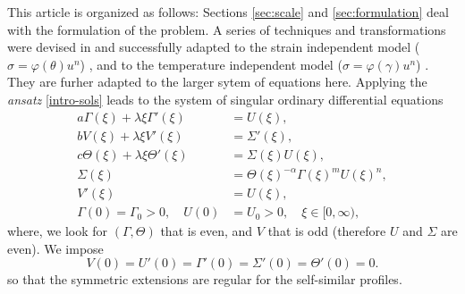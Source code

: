 \documentclass[a4paper,11pt]{article}
\def\blue{\color{blue}}
\theoremstyle{remark}
\begin{document}
This article is organized as follows: 
Sections \ref{sec:scale} and  \ref{sec:formulation} deal with the formulation of the problem. A series of techniques and transformations were devised in
 \cite{KOT14} and successfully adapted to the strain independent model ($\sigma=\varphi(\theta)u^n$) \cite{KLT_HYP2016}, 
 and to the temperature independent model ($\sigma=\varphi(\gamma)u^n$) \cite{LT16,KLT_2016}. 
 They are furher adapted to the larger sytem of equations here. Applying the {\it ansatz} \eqref{intro-sols} leads to the system of 
 singular ordinary differential equations
\begin{equation} \label{intro:ss-odes}
\begin{aligned}
 a \Gamma(\xi) + \lambda \xi \Gamma'(\xi) &= U(\xi), \\
 b V(\xi) + \lambda \xi V'(\xi) &= \Sigma'(\xi), \\
 c \Theta(\xi) + \lambda \xi \Theta'(\xi)&=\Sigma(\xi) U(\xi),\\
 \Sigma(\xi) &= \Theta(\xi)^{-\alpha} \Gamma(\xi)^m U(\xi)^n, \\
 V'(\xi)&=U(\xi),\\
 \Gamma(0)=\Gamma_0>0, \quad U(0)&=U_0>0, \quad \text{$\xi \in [0,\infty)$},
\end{aligned}
\end{equation}
{\blue where, we look for $(\Gamma,\Theta)$ that is even, and $V$ that is odd (therefore $U$ and $\Sigma$ are even).} We impose
\begin{equation}
 V(0)=U'(0)=\Gamma'(0)=\Sigma'(0)=\Theta'(0)=0. \label{intro:bdry0}
\end{equation}
so that the symmetric extensions are regular for the self-similar profiles.
\end{document}
